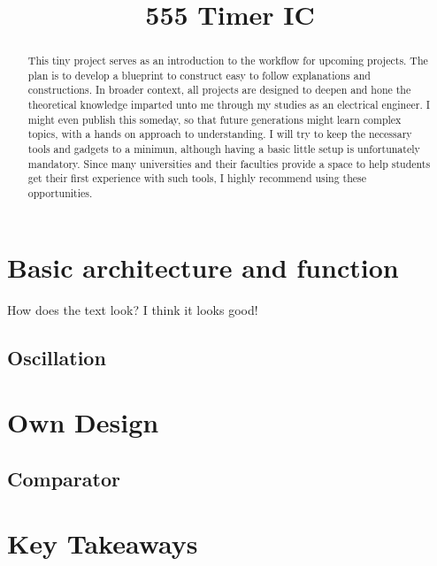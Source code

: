 \documentclass[]{scrartcl}
\title{555 Timer IC}
\begin{document}
	
	\maketitle
	\thispagestyle{empty}
	
	
	\begin{abstract}
		This tiny project serves as an introduction to the workflow for upcoming projects. The plan is to develop a blueprint to construct easy to follow explanations and constructions. In broader context, all projects are designed to deepen and hone the theoretical knowledge imparted unto me through my studies as an electrical engineer. I might even publish this someday, so that future generations might learn complex topics, with a hands on approach to understanding. I will try to keep the necessary tools and gadgets to a minimun, although having a basic little setup is unfortunately mandatory. Since many universities and their faculties provide a space to help students get their first experience with such tools, I highly recommend using these opportunities.  
	\end{abstract}
	\newpage
	\tableofcontents
	\thispagestyle{empty}
	
	\newpage
	\clearpage
	
	\section{Basic architecture and function}
	How does the text look? \newline
	I think it looks good!
	
	\newpage
	
	\subsection{Oscillation}
	
	\newpage
	
	\section{Own Design}
	
	\newpage
	
	\subsection{Comparator}
	
	\newpage
	
	\section{Key Takeaways}
	
	
\end{document}
